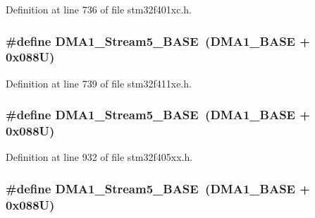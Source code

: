 Definition at line 736 of file stm32f401xc.\+h.

\subsubsection[{\texorpdfstring{D\+M\+A1\+\_\+\+Stream5\+\_\+\+B\+A\+SE}{DMA1_Stream5_BASE}}]{\setlength{\rightskip}{0pt plus 5cm}\#define D\+M\+A1\+\_\+\+Stream5\+\_\+\+B\+A\+SE~({\bf D\+M\+A1\+\_\+\+B\+A\+SE} + 0x088\+U)}\hypertarget{group___peripheral__registers__structures_ga0ded7bed8969fe2e2d616e7f90eb7654}{}\label{group___peripheral__registers__structures_ga0ded7bed8969fe2e2d616e7f90eb7654}


Definition at line 739 of file stm32f411xe.\+h.

\subsubsection[{\texorpdfstring{D\+M\+A1\+\_\+\+Stream5\+\_\+\+B\+A\+SE}{DMA1_Stream5_BASE}}]{\setlength{\rightskip}{0pt plus 5cm}\#define D\+M\+A1\+\_\+\+Stream5\+\_\+\+B\+A\+SE~({\bf D\+M\+A1\+\_\+\+B\+A\+SE} + 0x088\+U)}\hypertarget{group___peripheral__registers__structures_ga0ded7bed8969fe2e2d616e7f90eb7654}{}\label{group___peripheral__registers__structures_ga0ded7bed8969fe2e2d616e7f90eb7654}


Definition at line 932 of file stm32f405xx.\+h.

\subsubsection[{\texorpdfstring{D\+M\+A1\+\_\+\+Stream5\+\_\+\+B\+A\+SE}{DMA1_Stream5_BASE}}]{\setlength{\rightskip}{0pt plus 5cm}\#define D\+M\+A1\+\_\+\+Stream5\+\_\+\+B\+A\+SE~({\bf D\+M\+A1\+\_\+\+B\+A\+SE} + 0x088\+U)}\hypertarget{group___peripheral__registers__structures_ga0ded7bed8969fe2e2d616e7f90eb7654}{}\label{group___peripheral__registers__structures_ga0ded7bed8969fe2e2d616e7f90eb7654}


